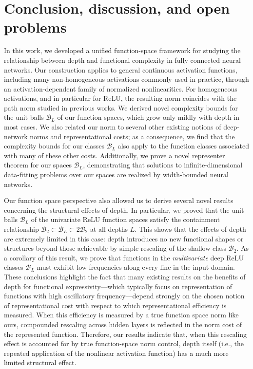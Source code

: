 \documentclass{article}
\def\cB{{\mathcal{B}}}
\begin{document}
\section{Conclusion, discussion, and open problems}

In this work, we developed a unified function-space framework for studying the relationship between depth and functional complexity in fully connected neural networks. Our construction applies to general continuous activation functions, including many non-homogeneous activations commonly used in practice, through an activation-dependent family of normalized nonlinearities. For homogeneous activations, and in particular for ReLU, the resulting norm coincides with the path norm studied in previous works. We derived novel complexity bounds for the unit balls $\cB_L$ of our function spaces, which grow only mildly with depth in most cases. We also related our norm to several other existing notions of deep-network norms and representational costs; as a consequence, we find that the complexity bounds for our classes $\cB_L$ also apply to the function classes associated with many of these other costs. Additionally, we prove a novel representer theorem for our spaces $\cB_L$, demonstrating that solutions to infinite-dimensional data-fitting problems over our spaces are realized by width-bounded neural networks.

Our function space perspective also allowed us to derive several novel results concerning the structural effects of depth. In particular, we proved that the unit balls $\cB_L$ of the univariate ReLU function spaces satisfy the containment relationship $\cB_2 \subset \cB_L \subset 2 \cB_2$ at all depths $L$. This shows that the effects of depth are extremely limited in this case: depth introduces no new functional shapes or structures beyond those achievable by simple rescaling of the shallow class $\cB_2$. As a corollary of this result, we prove that functions in the \textit{multivariate} deep ReLU classes $\cB_L$ must exhibit low frequencies along every line in the input domain. These conclusions highlight the fact that many existing results on the benefits of depth for functional expressivity---which typically focus on representation of functions with high oscillatory frequency---depend strongly on the chosen notion of representational cost with respect to which representational efficiency is measured. When this efficiency is measured by a true function space norm like ours, compounded rescaling across hidden layers is reflected in the norm cost of the represented function. Therefore, our results indicate that, when this rescaling effect is accounted for by true function-space norm control, depth itself (i.e., the repeated application of the nonlinear activation function) has a much more limited structural effect.
\end{document}
